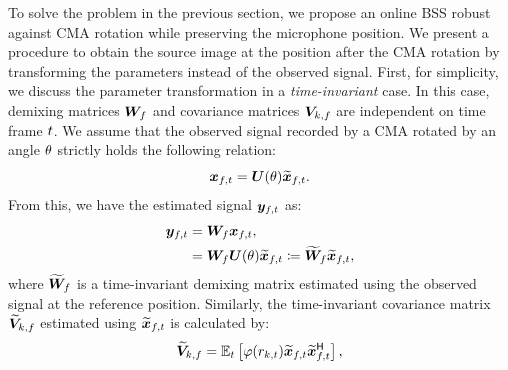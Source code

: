 \documentclass[sip,biber]{now-journal}
\begin{document}
To solve the problem in the previous section, we propose an online BSS robust against CMA rotation while preserving the microphone position.
We present a procedure to obtain the source image at the position after the CMA rotation by transforming the parameters instead of the observed signal.
First, for simplicity, we discuss the parameter transformation in a \emph{time-invariant} case.
In this case, demixing matrices $\bm{W} _{f}$ and covariance matrices $\bm{V} _{k,f}$ are independent on time frame $t$.
We assume that the observed signal recorded by a CMA rotated by an angle $\theta$ strictly holds the following relation:
\begin{equation}
  \Obs _{\ft} = \rotMat (\rotSpat) \refpos{\Obs} _{\ft}.
\end{equation}
From this, we have the estimated signal $\Est _{\ft}$ as:
\begin{align}
  \Est _{\ft} &= \Demix _{\freq} \Obs _{\ft}, \\
              &= \Demix _{\freq} \rotMat (\rotSpat) \refpos{\Obs} _{\ft} \coloneqq \refpos{\Demix} _{\freq} \refpos{\Obs} _{\ft}, \label{eq:rt:demix:batch}
\end{align}
where $\widetilde{\bm{W}} _{f}$ is a time-invariant demixing matrix estimated using the observed signal at the reference position.
Similarly, the time-invariant covariance matrix $\widetilde{\bm{V}} _{k,f}$ estimated using $\refpos{\Obs} _{\ft}$ is calculated by:
\begin{equation}
  \refpos{\cov} _{\src,\freq} = \expct  _{\tframe} \left[\weight (\var _{\src,\tframe}) \refpos{\Obs} _{\ft} \refpos{\Obs} _{\ft} ^{\hermite}\right],
\end{equation}
\end{document}
